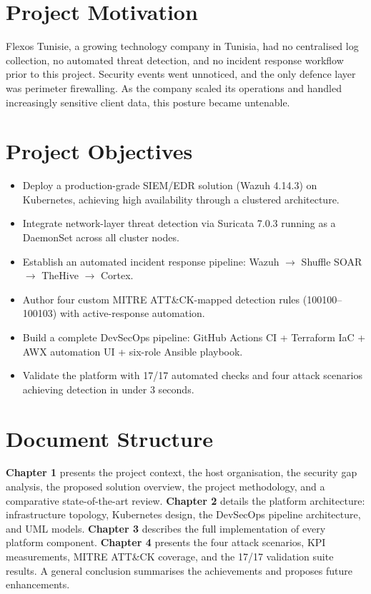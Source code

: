\documentclass[12pt,a4paper]{report}
\begin{document}
\section*{Project Motivation}

Flexos Tunisie, a growing technology company in Tunisia, had no centralised log collection, no automated threat detection, and no incident response workflow prior to this project. Security events went unnoticed, and the only defence layer was perimeter firewalling. As the company scaled its operations and handled increasingly sensitive client data, this posture became untenable.

\section*{Project Objectives}

\begin{itemize}
  \item Deploy a production-grade SIEM/EDR solution (Wazuh 4.14.3) on Kubernetes, achieving high availability through a clustered architecture.
  \item Integrate network-layer threat detection via Suricata 7.0.3 running as a DaemonSet across all cluster nodes.
  \item Establish an automated incident response pipeline: Wazuh $\rightarrow$ Shuffle SOAR $\rightarrow$ TheHive $\rightarrow$ Cortex.
  \item Author four custom MITRE ATT\&CK-mapped detection rules (100100--100103) with active-response automation.
  \item Build a complete DevSecOps pipeline: GitHub Actions CI + Terraform IaC + AWX automation UI + six-role Ansible playbook.
  \item Validate the platform with 17/17 automated checks and four attack scenarios achieving detection in under 3 seconds.
\end{itemize}

\section*{Document Structure}

\textbf{Chapter 1} presents the project context, the host organisation, the security gap analysis, the proposed solution overview, the project methodology, and a comparative state-of-the-art review. \textbf{Chapter 2} details the platform architecture: infrastructure topology, Kubernetes design, the DevSecOps pipeline architecture, and UML models. \textbf{Chapter 3} describes the full implementation of every platform component. \textbf{Chapter 4} presents the four attack scenarios, KPI measurements, MITRE ATT\&CK coverage, and the 17/17 validation suite results. A general conclusion summarises the achievements and proposes future enhancements.
\end{document}
